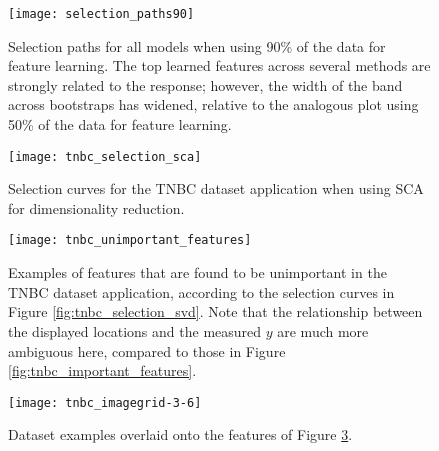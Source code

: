 \begin{figure}
  \centering
  \texttt{[image: selection\_paths90]}
  \caption{Selection paths for all models when using 90\% of the data for
    feature learning. The top learned features across several methods are
    strongly related to the response; however, the width of the band across
    bootstraps has widened, relative to the analogous plot using 50\% of the
    data for feature learning.}
  \label{fig:selection_paths90}
\end{figure}

\begin{figure}
  \centering
  \texttt{[image: tnbc\_selection\_sca]}
  \caption{Selection curves for the TNBC dataset application when using SCA for
    dimensionality reduction.}
  \label{fig:tnbc_selection_sca}
\end{figure}

\begin{figure}
  \centering
  \texttt{[image: tnbc\_unimportant\_features]}
  \caption{Examples of features that are found to be unimportant in the TNBC
    dataset application, according to the selection curves in Figure
    \ref{fig:tnbc_selection_svd}. Note that the relationship between the
    displayed locations and the measured $y$ are much more ambiguous here,
    compared to those in Figure \ref{fig:tnbc_important_features}.}
  \label{fig:tnbc_unimportant_features}
\end{figure}

\begin{figure}
  \centering
  \texttt{[image: tnbc\_imagegrid-3-6]}
  \label{fig:tnbc_imagegrid-3-6}
  \caption{Dataset examples overlaid onto the features of Figure
    \ref{fig:tnbc_unimportant_features}.}
\end{figure}
